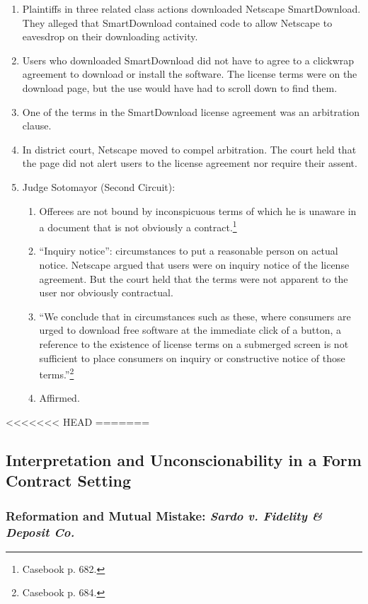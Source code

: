 \begin{enumerate}
    \item Plaintiffs in three related class actions downloaded Netscape 
    SmartDownload. They alleged that SmartDownload contained code to allow 
    Netscape to eavesdrop on their downloading activity.
    \item Users who downloaded SmartDownload did not have to agree to a 
    clickwrap agreement to download or install the software. The license terms 
    were on the download page, but the use would have had to scroll down to 
    find them.
    \item One of the terms in the SmartDownload license agreement was an 
    arbitration clause.
    \item In district court, Netscape moved to compel arbitration. The court 
    held that the page did not alert users to the license agreement nor 
    require their assent.
    \item Judge Sotomayor (Second Circuit):
    \begin{enumerate}
        \item Offerees are not bound by inconspicuous terms of which he is 
        unaware in a document that is not obviously a 
        contract.\footnote{Casebook p. 682.}
        \item ``Inquiry notice'': circumstances to put a reasonable person on 
        actual notice. Netscape argued that users were on inquiry notice of 
        the license agreement. But the court held that the terms were not 
        apparent to the user nor obviously contractual.
        \item ``We conclude that in circumstances such as these, where 
        consumers are urged to download free software at the immediate click 
        of a button, a reference to the existence of license terms on a 
        submerged screen is not sufficient to place consumers on inquiry or 
        constructive notice of those terms.''\footnote{Casebook p. 684.}
        \item Affirmed.
    \end{enumerate}
\end{enumerate}
<<<<<<< HEAD
=======

\subsection{Interpretation and Unconscionability in a Form Contract Setting}

\subsubsection{Reformation and Mutual Mistake: \emph{Sardo v. Fidelity \& 
Deposit Co.}}

